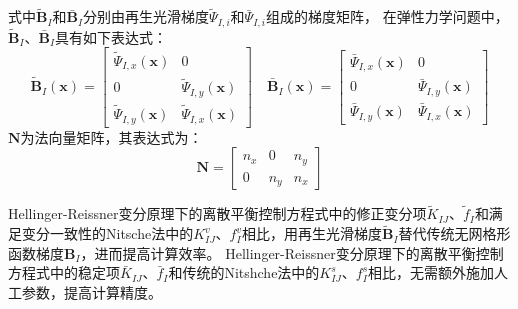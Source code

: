式中$\tilde{\pmb B}_I$和$\bar{\pmb B}_I$分别由再生光滑梯度$\tilde{\Psi}_{I,i}$和$\bar{\Psi}_{I,i}$组成的梯度矩阵，
在弹性力学问题中，$\tilde{\pmb B}_I$、$\bar{\pmb B}_I$具有如下表达式：
\begin{equation}
    \tilde{\pmb{B}}_I(\pmb{x})= \begin{bmatrix}\tilde{\Psi}_{I,x}(\pmb{x})&0\\0&\tilde{\Psi}_{I,y}(\pmb{x})\\\tilde{\Psi}_{I,y}(\pmb{x})&\tilde{\Psi}_{I,x}(\pmb{x}) \end{bmatrix} 
    \quad
    \bar{\pmb{B}}_I(\pmb{x})= \begin{bmatrix}\bar{\Psi}_{I,x}(\pmb{x})&0\\0&\bar{\Psi}_{I,y}(\pmb{x})\\\bar{\Psi}_{I,y}(\pmb{x})&\bar{\Psi}_{I,x}(\pmb{x}) \end{bmatrix}
\end{equation}
$\pmb N$为法向量矩阵，其表达式为：
\begin{equation}
    \pmb{N}=\begin{bmatrix}n_x&0&n_y\\0&n_y&n_x
    \end{bmatrix}
\end{equation}\par
Hellinger-Reissner变分原理下的离散平衡控制方程式中的修正变分项$\tilde{K}_{IJ}$、$\tilde{f}_I$和满足变分一致性的Nitsche法中的$K_{IJ}^v$、$f_I^v$相比，用再生光滑梯度$\tilde{\pmb{B}}_I$替代传统无网格形函数梯度$\pmb{B}_I$，进而提高计算效率。
Hellinger-Reissner变分原理下的离散平衡控制方程式中的稳定项$\bar{K}_{IJ}$、$\bar{f}_I$和传统的Nitshche法中的$K^s_{IJ}$、$f^s_I$相比，无需额外施加人工参数，提高计算精度。\par
